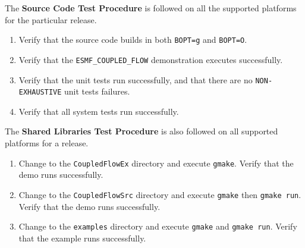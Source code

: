 The {\bf Source Code Test Procedure} is followed on all the supported
platforms for the particular release.

\begin{enumerate}
\item Verify that the source code builds in both {\tt BOPT=g} and {\tt BOPT=O}.
\item Verify that  the {\tt ESMF\_COUPLED\_FLOW} demonstration executes successfully.
\item Verify that the unit tests run successfully, and that there are no {\tt NON-EXHAUSTIVE} unit tests  failures.
\item Verify that all system tests run successfully. 
\end{enumerate}

The {\bf Shared Libraries Test Procedure} is also followed on all supported
platforms for a release.

\begin{enumerate}
\item Change to the {\tt CoupledFlowEx} directory and execute {\tt gmake}. Verify that the demo runs successfully.
\item Change to the {\tt CoupledFlowSrc} directory and execute {\tt gmake} then {\tt gmake run}. Verify that the demo runs successfully.
\item Change to the {\tt examples} directory and execute {\tt gmake} and {\tt gmake run}. Verify that the example runs successfully.
\end{enumerate}














